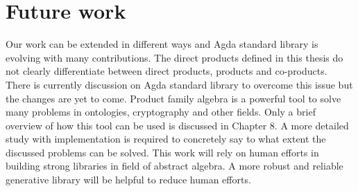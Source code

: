 \section{Future work}
\label{future}
Our work can be extended in different ways and Agda standard library is evolving
with many contributions. The direct products defined in this thesis do not
clearly differentiate between direct products, products and co-products. There
is currently discussion on Agda standard library to overcome this issue but the
changes are yet to come. Product family algebra is a powerful tool to solve many
problems in ontologies, cryptography and other fields. Only a brief overview of
how this tool can be used is discussed in Chapter 8. A more detailed study with
implementation is required to concretely say to what extent the discussed
problems can be solved. This work will rely on human efforts in building strong
libraries in field of abstract algebra. A more robust and reliable generative
library will be helpful to reduce human efforts. 


